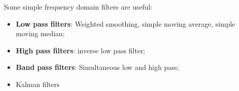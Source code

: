Some simple frequency domain filters are useful:

\begin{itemize}
    \item \textbf{Low pass filters}: Weighted smoothing, simple moving average,
simple moving median;
    \item \textbf{High pass filters}: inverse low pass filter;
    \item \textbf{Band pass filters}: Simultaneous low and high pass;
    \item Kalman filters
\end{itemize}





